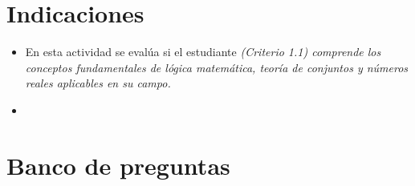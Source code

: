 \documentclass[a4,11pt]{aleph-notas}
\begin{document}
\encabezado

\vspace*{-8mm}
\section{Indicaciones}

\begin{itemize}[leftmargin=*]
\item 
    En esta actividad se evalúa si el estudiante \textit{(Criterio 1.1) comprende los conceptos fundamentales de lógica matemática, teoría de conjuntos y números reales aplicables en su campo.}
\item
    
\end{itemize}

\section{Banco de preguntas}
\end{document}
